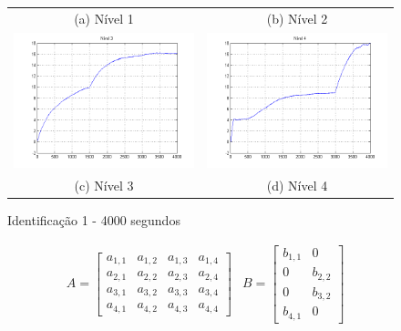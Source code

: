 \begin{itemize}
\begin{figure}[H]
\begin{tabular}{cc}
		(a) Nível 1 &
		(b) Nível 2 \\
		\includegraphics[height=0.15\paperheight,keepaspectratio]{img/sim1_h3.png} &
		\includegraphics[height=0.15\paperheight,keepaspectratio]{img/sim1_h4.png} \\
		(c) Nível 3 &
		(d) Nível 4
	\end{tabular}
	\caption{\label{imgID_4Results} Identificação 1 - 4000 segundos}
\end{figure}

\begin{align}
	& A =
	\begin{bmatrix}
		a_{1,1} & a_{1,2} & a_{1,3} & a_{1,4} \\
		a_{2,1} & a_{2,2} & a_{2,3} & a_{2,4} \\
		a_{3,1} & a_{3,2} & a_{3,3} & a_{3,4} \\
		a_{4,1} & a_{4,2} & a_{4,3} & a_{4,4}
	\end{bmatrix}
	& B =
	\begin{bmatrix}
		b_{1,1} & 0 \\
		0 & b_{2,2} \\
		0 & b_{3,2} \\
		b_{4,1} & 0
	\end{bmatrix}
\end{align}


\end{itemize}
